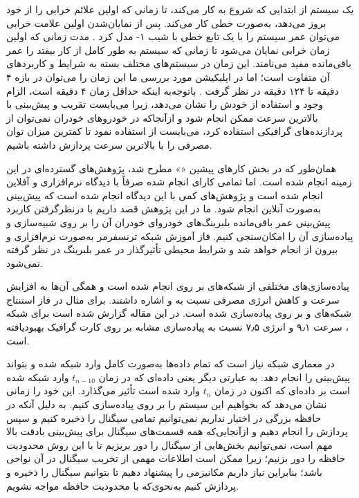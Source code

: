 
 \label{contrib}



یک سیستم از ابتدایی که شروع به کار می‌کند، تا زمانی که اولین علائم خرابی را از خود بروز می‌دهد، به‌صورت خطی کار می‌کند. پس از نمایان‌شدن اولین علامت خرابی می‌توان عمر سیستم را با یک تابع خطی با شیب ۱- مدل کرد . مدت زمانی که اولین زمان خرابی نمایان می‌شود تا زمانی که سیستم به طور کامل از کار بیفتد را عمر باقی‌مانده مفید می‌نامند. این زمان در سیستم‌های مختلف بسته به شرایط و کاربردهای آن متفاوت است؛ اما در اپلیکیشن مورد بررسی ما این زمان را می‌توان در بازه ۴ دقیقه تا ۱۲۴ دقیقه در نظر گرفت . باتوجه‌به اینکه حداقل زمان ۴ دقیقه است، الزام وجود و استفاده از  خودش را نشان می‌دهد، زیرا می‌بایست تقریب و پیش‌بینی با بالاترین سرعت ممکن انجام شود و ازآنجاکه در خودروهای خودران نمی‌توان از پردازنده‌های گرافیکی استفاده کرد، می‌بایست از  استفاده نمود تا کمترین میزان توان مصرفی را با بالاترین سرعت پردازش داشته باشیم.



همان‌طور که در بخش کار‌های پیشین «» مطرح شد، پژوهش‌های گسترده‌ای در این زمینه انجام شده است. اما تمامی کارای انجام شده صرفاً با دیدگاه نرم‌افزاری و آفلاین انجام شده است و پژوهش‌های کمی با این دیدگاه انجام شده است که پیش‌بینی به‌صورت آنلاین انجام شود. ما در این پژوهش قصد داریم با درنظرگرفتن کاربرد پیش‌بینی عمر باقی‌مانده بلبرینگ‌های خودروای خودران آن را بر روی  شبیه‌سازی و پیاده‌سازی آن را امکان‌سنجی کنیم. فاز آموزش شبکه ترنسفرمر به‌صورت نرم‌افزاری و بیرون از  انجام خواهد شد و شرایط محیطی تأثیرگذار در عمر بلبرینگ در نظر گرفته نمی‌شود. 



پیاده‌سازی‌های مختلفی از شبکه‌های  بر روی  انجام شده است و همگی آن‌ها به افزایش سرعت و کاهش انرژی مصرفی نسبت به  و  اشاره داشتند. برای مثال در  فاز استنتاج شبکه‌های  و  بر روی  پیاده‌سازی شده است. در این مقاله گزارش شده است برای شبکه ، سرعت ۹٫۱ و انرژی ۷٫۵ نسبت به پیاده‌سازی مشابه بر روی کارت گرافیک  بهبودیافته است.




در معماری شبکه  نیاز است که تمام داده‌ها به‌صورت کامل وارد شبکه شده و بتواند پیش‌بینی  را انجام دهد. به عبارتی دیگر یعنی داده‌ای که در زمان $t_{n-10}$ وارد شبکه شده است بر داده‌ای که اکنون در زمان $t_n$ وارد شده است تأثیر می‌گذارد. این خود را زمانی نشان می‌دهد که بخواهیم این سیستم را بر روی  پیاده‌سازی کنیم. به دلیل آنکه در  حافظه بزرگی در اختیار نداریم نمی‌توانیم تمامی سیگنال را ذخیره کنیم و سپس پردازش را انجام دهیم و ازآنجایی‌که همه قسمت‌های سیگنال برای پیش‌بینی  بادقت بالا مهم است، نمی‌توانیم بخش‌هایی از سیگنال را دور بریزیم تا با این روش محدودیت حافظه را دور بزنیم؛ زیرا ممکن است اطلاعات مهمی از تخریب سیگنال در آن نواحی باشد؛ بنابراین نیاز داریم مکانیزمی را پیشنهاد دهیم تا بتوانیم سیگنال را ذخیره و پردازش کنیم به‌نحوی‌که با محدودیت حافظه مواجه نشویم.




